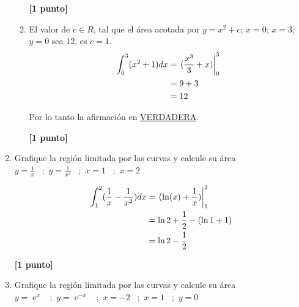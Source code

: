 \documentclass[letterpaper,10pt]{article}
\newcommand{\dis}{\displaystyle}
\def\e{\operatorname{e}}
\begin{document}
\begin{enumerate}
\begin{enumerate}[label=\emph{\alph*)}]
\dotfill\textbf{[1 punto]}

\newpage
\item El valor de $c \in R$, tal que el área acotada por $y = x^2+c$; $x=0$; $x=3$; $y=0$ sea 12, es $c=1$.\\

\begin{align*}
\dis \int_0^3 (x^2 +1)dx &= \displaystyle   \left.(\frac{x^3}{3}+x)\right|_{0}^{3}\\
\dis  &= 9+3\\
\dis  &= 12
\end{align*}

Por lo tanto la afirmación en \underline{VERDADERA}.

\dotfill\textbf{[1 punto]}

\newpage

\end{enumerate}

\item Grafique la regi\'{o}n  limitada por las curvas y calcule su \'{a}rea\\
$\dis y=\frac{1}{x}$ \, ;\,  $\dis y=\frac{1}{x^2}$ \, ;\, $x=1$ \, ;\, $x=2$

\begin{figure}[!htb]\centering
   \begin{minipage}{0.6\textwidth}
     
   \end{minipage}
   \begin {minipage}{0.3\textwidth}
     
   \end{minipage}
\end{figure}

\begin{align*}
\dis \int_1^2 (\frac{1}{x}- \frac{1}{x^2})dx &= \displaystyle   \left.(\ln (x)+\frac{1}{x})\right|_{1}^{2}\\
\dis  &= \ln 2 + \frac{1}{2} - (\ln 1 + 1)\\
\dis  &= \ln 2 - \frac{1}{2}
\end{align*}

\dotfill\textbf{[1 punto]}

\item Grafique la regi\'{o}n  limitada por las curvas y calcule su \'{a}rea\\
$\dis y=\e^x$ \, ;\,  $\dis y=\e^{-x}$ \, ;\, $x=-2$ \, ;\, $x=1$ \, ;\,  $\dis y=0$



\end{enumerate}
\end{document}
